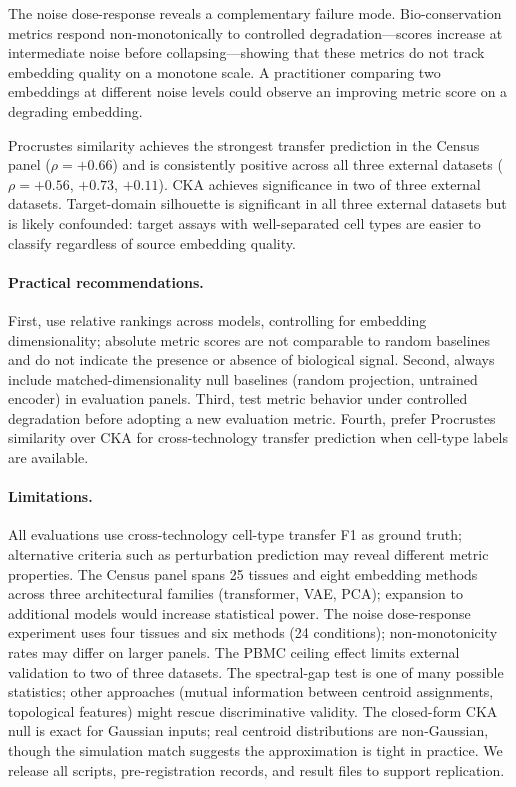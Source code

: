\documentclass[11pt]{article}
\begin{document}
The noise dose-response reveals a complementary failure mode.
Bio-conservation metrics respond non-monotonically to controlled
degradation---scores increase at intermediate noise before
collapsing---showing that these metrics do not track embedding quality
on a monotone scale. A practitioner comparing two embeddings at
different noise levels could observe an improving metric score on a
degrading embedding.

Procrustes similarity achieves the strongest transfer prediction in the
Census panel ($\rho = +0.66$) and is consistently positive across all
three external datasets ($\rho = +0.56$, $+0.73$, $+0.11$). CKA
achieves significance in two of three external datasets. Target-domain
silhouette is significant in all three external datasets but is likely
confounded: target assays with well-separated cell types are easier to
classify regardless of source embedding quality.

\paragraph{Practical recommendations.} First, use relative rankings
across models, controlling for embedding dimensionality; absolute metric
scores are not comparable to random baselines and do not indicate the
presence or absence of biological signal. Second, always include
matched-dimensionality null baselines (random projection, untrained
encoder) in evaluation panels. Third, test metric behavior under
controlled degradation before adopting a new evaluation metric. Fourth,
prefer Procrustes similarity over CKA for cross-technology transfer
prediction when cell-type labels are available.

\paragraph{Limitations.} All evaluations use cross-technology cell-type
transfer F1 as ground truth; alternative criteria such as perturbation
prediction may reveal different metric properties. The Census panel
spans 25 tissues and eight embedding methods across three architectural
families (transformer, VAE, PCA); expansion to additional models would
increase statistical power. The noise dose-response experiment uses four
tissues and six methods (24 conditions); non-monotonicity rates may
differ on larger panels. The PBMC ceiling effect limits external
validation to two of three datasets. The spectral-gap test is one of
many possible statistics; other approaches (mutual information between
centroid assignments, topological features) might rescue discriminative
validity. The closed-form CKA null is exact for Gaussian inputs; real
centroid distributions are non-Gaussian, though the simulation match
suggests the approximation is tight in practice. We release all scripts,
pre-registration records, and result files to support replication.
\end{document}
